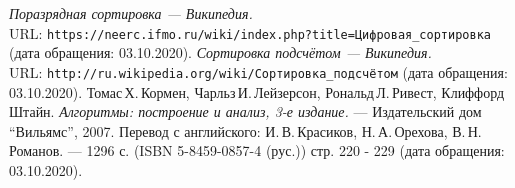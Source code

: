 
\begin{thebibliography}{99}
{\itshape Поразрядная сортировка — Википедия.} \\URL: \texttt{https://neerc.ifmo.ru/wiki/index.php?title=Цифровая\_сортировка} (дата обращения: 03.10.2020).
{\itshape Сортировка подсчётом — Википедия.} \\URL: \texttt{http://ru.wikipedia.org/wiki/Сортировка\_подсчётом} (дата обращения: 03.10.2020).
Томас\,Х.\,Кормен, Чарльз\,И.\,Лейзерсон, Рональд\,Л.\,Ривест, Клиффорд\,Штайн.
{\itshape Алгоритмы: построение и анализ, 3-е издание.} --- Издательский дом \enquote{Вильямс}, 2007. Перевод с английского: И.\,В.\,Красиков, Н.\,А.\,Орехова, В.\,Н.\,Романов. --- 1296 с. (ISBN 5-8459-0857-4 (рус.)) стр. 220 - 229 (дата обращения: 03.10.2020).
\end{thebibliography}
\pagebreak